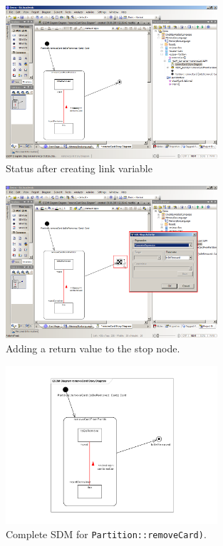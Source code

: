 \begin{figure}[htp]
\begin{center}
  \includegraphics[width=0.7\textwidth]{pics/sdmBilder/removeCard/sdm13RAW}
  \caption{Status after creating link variable}  
  \label{fig:link_variable_added}
\end{center}
\end{figure}

\begin{figure}[htp]
\begin{center}
  \includegraphics[width=0.7\textwidth]{pics/sdmBilder/removeCard/sdm14RAW}
  \caption{Adding a return value to the stop node.}  
  \label{fig:stop_node_return_value}
\end{center}
\end{figure}

\begin{figure}[htp]
\begin{center}
  \includegraphics[width=0.7\textwidth]{pics/sdmBilder/removeCard/sdm15}
  \caption{Complete SDM for \texttt{Partition::removeCard)}.}  
  \label{fig:sdm_complete_control_flow}
\end{center}
\end{figure}

\clearpage